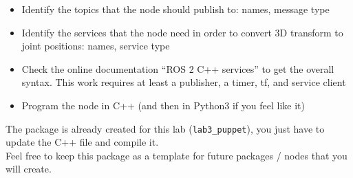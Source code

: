 \documentclass{ecnreport}
\begin{document}
\begin{itemize}
\item Identify the topics that the node should publish to: names, message type
\item Identify the services that the node need in order to convert 3D transform to joint positions: names, service type
\item Check the online documentation ``ROS 2 C++ services'' to get the overall syntax. This work requires at least a publisher, a timer, tf, and service client
\item Program the node in C++ (and then in Python3 if you feel like it)
\end{itemize}

The package is already created for this lab (\texttt{lab3\_puppet}), you just have to update the C++ file and compile it.\\
Feel free to keep this package as a template for future packages / nodes that you will create.
\end{document}
